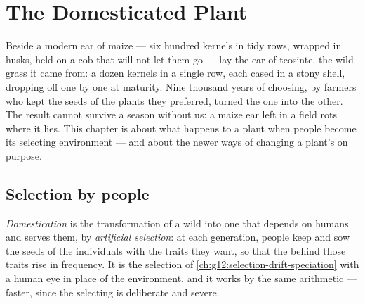 \chapter{The Domesticated Plant}\label{ch:g12:domesticated-plants}

Beside a modern ear of maize --- six hundred kernels in tidy rows,
wrapped in husks, held on a cob that will not let them go --- lay the
ear of teosinte, the wild grass it came from: a dozen kernels in a
single row, each cased in a stony shell, dropping off one by one at
maturity. Nine thousand years of choosing, by farmers who kept the
seeds of the plants they preferred, turned the one into the other. The
result cannot survive a season without us: a maize ear left in a field
rots where it lies. This chapter is about what happens to a plant when
people become its selecting environment --- and about the newer ways
of changing a plant's  on purpose.

\section{Selection by people}

\begin{definition}\label{def:g12:domesticated-plants:domestication}
\emph{Domestication} is the transformation of a
wild  into one that depends on humans and serves them, by
\emph{artificial selection}: at each
generation, people keep and sow the seeds of the individuals with the
traits they want, so that the  behind those traits rise in
frequency. It is the selection of \cref{ch:g12:selection-drift-speciation}
with a human eye in place of the environment, and it works by the same
arithmetic --- faster, since the selecting is deliberate and severe.
\end{definition}

